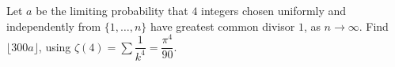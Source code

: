 Let $a$ be the limiting probability that $4$ integers chosen uniformly and independently from $\{1,\dots,n\}$ have greatest common divisor $1$, as $n\to\infty$. Find $\lfloor300a\rfloor$, using $\zeta(4)=\sum\dfrac1{k^4}=\dfrac{\pi^4}{90}$.
